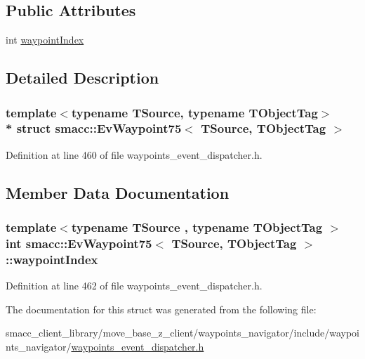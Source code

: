 \subsection*{Public Attributes}
\begin{DoxyCompactItemize}
\item 
int \hyperlink{structsmacc_1_1EvWaypoint75_a101bd50dc43879aec0d6aa2aa600e3a0}{waypoint\+Index}
\end{DoxyCompactItemize}


\subsection{Detailed Description}
\subsubsection*{template$<$typename T\+Source, typename T\+Object\+Tag$>$\\*
struct smacc\+::\+Ev\+Waypoint75$<$ T\+Source, T\+Object\+Tag $>$}



Definition at line 460 of file waypoints\+\_\+event\+\_\+dispatcher.\+h.



\subsection{Member Data Documentation}
\subsubsection[{\texorpdfstring{waypoint\+Index}{waypointIndex}}]{\setlength{\rightskip}{0pt plus 5cm}template$<$typename T\+Source , typename T\+Object\+Tag $>$ int {\bf smacc\+::\+Ev\+Waypoint75}$<$ T\+Source, T\+Object\+Tag $>$\+::waypoint\+Index}\hypertarget{structsmacc_1_1EvWaypoint75_a101bd50dc43879aec0d6aa2aa600e3a0}{}\label{structsmacc_1_1EvWaypoint75_a101bd50dc43879aec0d6aa2aa600e3a0}


Definition at line 462 of file waypoints\+\_\+event\+\_\+dispatcher.\+h.



The documentation for this struct was generated from the following file\+:\begin{DoxyCompactItemize}
\item 
smacc\+\_\+client\+\_\+library/move\+\_\+base\+\_\+z\+\_\+client/waypoints\+\_\+navigator/include/waypoints\+\_\+navigator/\hyperlink{waypoints__event__dispatcher_8h}{waypoints\+\_\+event\+\_\+dispatcher.\+h}\end{DoxyCompactItemize}
